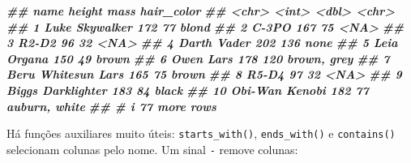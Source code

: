 \documentclass[
  portuguese,
  11pt,
  openany]{book}
\newenvironment{Shaded}{\begin{snugshade}}{\end{snugshade}}
\newcommand{\DocumentationTok}[1]{\textcolor[rgb]{0.56,0.35,0.01}{\textbf{\textit{#1}}}}
\newcounter{none} %
\begin{document}
\begin{Shaded}
\begin{Highlighting}[]
\DocumentationTok{\#\#    name               height  mass hair\_color   }
\DocumentationTok{\#\#    \textless{}chr\textgreater{}               \textless{}int\textgreater{} \textless{}dbl\textgreater{} \textless{}chr\textgreater{}        }
\DocumentationTok{\#\#  1 Luke Skywalker        172    77 blond        }
\DocumentationTok{\#\#  2 C{-}3PO                 167    75 \textless{}NA\textgreater{}         }
\DocumentationTok{\#\#  3 R2{-}D2                  96    32 \textless{}NA\textgreater{}         }
\DocumentationTok{\#\#  4 Darth Vader           202   136 none         }
\DocumentationTok{\#\#  5 Leia Organa           150    49 brown        }
\DocumentationTok{\#\#  6 Owen Lars             178   120 brown, grey  }
\DocumentationTok{\#\#  7 Beru Whitesun Lars    165    75 brown        }
\DocumentationTok{\#\#  8 R5{-}D4                  97    32 \textless{}NA\textgreater{}         }
\DocumentationTok{\#\#  9 Biggs Darklighter     183    84 black        }
\DocumentationTok{\#\# 10 Obi{-}Wan Kenobi        182    77 auburn, white}
\DocumentationTok{\#\# \# i 77 more rows}
\end{Highlighting}
\end{Shaded}

Há funções auxiliares muito úteis: \texttt{starts\_with()}, \texttt{ends\_with()} e \texttt{contains()}
selecionam colunas pelo nome. Um sinal \texttt{-} remove colunas:
\end{document}
